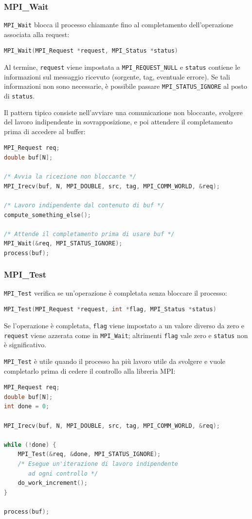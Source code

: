 \subsubsection{MPI\_Wait}
\texttt{MPI\_Wait} blocca il processo chiamante fino al completamento dell'operazione associata alla request:
\begin{lstlisting}[language=C, numbers=none]
MPI_Wait(MPI_Request *request, MPI_Status *status)
\end{lstlisting}
Al termine, \texttt{request} viene impostata a \texttt{MPI\_REQUEST\_NULL} e \texttt{status} contiene le informazioni sul messaggio ricevuto (sorgente, tag, eventuale errore). Se tali informazioni non sono necessarie, è possibile passare \texttt{MPI\_STATUS\_IGNORE} al posto di \texttt{status}.

Il pattern tipico consiste nell'avviare una comunicazione non bloccante, svolgere del lavoro indipendente in sovrapposizione, e poi attendere il completamento prima di accedere al buffer:
\begin{lstlisting}[language=C, numbers=none]
MPI_Request req;
double buf[N];

/* Avvia la ricezione non bloccante */
MPI_Irecv(buf, N, MPI_DOUBLE, src, tag, MPI_COMM_WORLD, &req);

/* Lavoro indipendente dal contenuto di buf */
compute_something_else();

/* Attende il completamento prima di usare buf */
MPI_Wait(&req, MPI_STATUS_IGNORE);
process(buf);
\end{lstlisting}

\subsubsection{MPI\_Test}
\texttt{MPI\_Test} verifica se un'operazione è completata senza bloccare il processo:
\begin{lstlisting}[language=C, numbers=none]
MPI_Test(MPI_Request *request, int *flag, MPI_Status *status)
\end{lstlisting}
Se l'operazione è completata, \texttt{flag} viene impostato a un valore diverso da zero e \texttt{request} viene azzerata come in \texttt{MPI\_Wait}; altrimenti \texttt{flag} vale zero e \texttt{status} non è significativo.

\texttt{MPI\_Test} è utile quando il processo ha più lavoro utile da svolgere e vuole completarlo prima di cedere il controllo alla libreria MPI:
\begin{lstlisting}[language=C, numbers=none]
MPI_Request req;
double buf[N];
int done = 0;

MPI_Irecv(buf, N, MPI_DOUBLE, src, tag, MPI_COMM_WORLD, &req);

while (!done) {
    MPI_Test(&req, &done, MPI_STATUS_IGNORE);
    /* Esegue un'iterazione di lavoro indipendente
       ad ogni controllo */
    do_work_increment();
}

process(buf);
\end{lstlisting}

